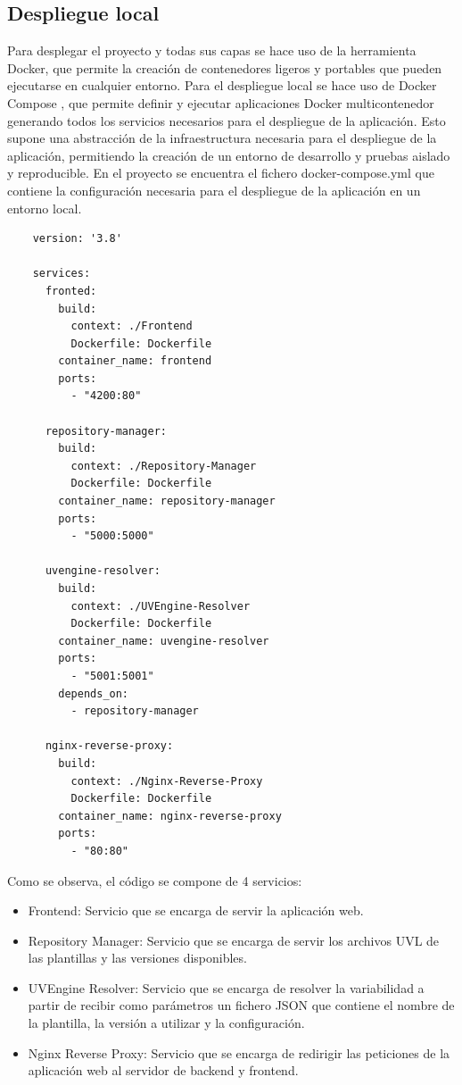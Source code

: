 \documentclass[12pt, a4paper, twoside]{article}
\begin{document}
\subsection{Despliegue local}
Para desplegar el proyecto y todas sus capas se hace uso de la herramienta Docker, que permite la creación de contenedores ligeros y portables que pueden ejecutarse en cualquier entorno.
Para el despliegue local se hace uso de Docker Compose \cite{docker_desktop}, que permite definir y ejecutar aplicaciones Docker multicontenedor generando todos los servicios necesarios para el despliegue de la aplicación.
Esto supone una abstracción de la infraestructura necesaria para el despliegue de la aplicación, permitiendo la creación de un entorno de desarrollo y pruebas aislado y reproducible.
En el proyecto se encuentra el fichero docker-compose.yml que contiene la configuración necesaria para el despliegue de la aplicación en un entorno local.
\begin{verbatim}
	version: '3.8'

	services:
	  fronted:
		build:
		  context: ./Frontend
		  Dockerfile: Dockerfile
		container_name: frontend
		ports:
		  - "4200:80"
	  
	  repository-manager:
		build:
		  context: ./Repository-Manager
		  Dockerfile: Dockerfile
		container_name: repository-manager
		ports:
		  - "5000:5000"
	
	  uvengine-resolver:
		build:
		  context: ./UVEngine-Resolver
		  Dockerfile: Dockerfile
		container_name: uvengine-resolver
		ports:
		  - "5001:5001"
		depends_on:
		  - repository-manager
	  
	  nginx-reverse-proxy:
		build:
		  context: ./Nginx-Reverse-Proxy
		  Dockerfile: Dockerfile
		container_name: nginx-reverse-proxy
		ports:
		  - "80:80"
	\end{verbatim}

Como se observa, el código se compone de 4 servicios:
\begin{itemize}
	\item Frontend: Servicio que se encarga de servir la aplicación web.
	\item Repository Manager: Servicio que se encarga de servir los archivos UVL de las plantillas y las versiones disponibles.
	\item UVEngine Resolver: Servicio que se encarga de resolver la variabilidad a partir de recibir como parámetros un fichero JSON que contiene el nombre de la plantilla, la versión a utilizar y la configuración.
	\item Nginx Reverse Proxy: Servicio que se encarga de redirigir las peticiones de la aplicación web al servidor de backend y frontend.	
\end{itemize}
\end{document}
